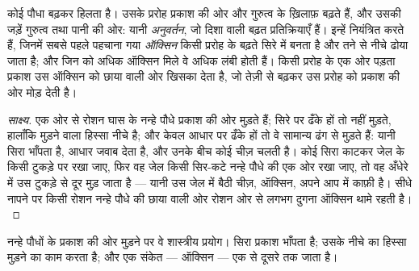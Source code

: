 \begin{proposition}[बढ़त ही हलचल]\label{prop:g12:plant-rooted-life:tropisms}
कोई पौधा बढ़कर हिलता है। उसके प्ररोह प्रकाश की ओर और गुरुत्व के ख़िलाफ़
बढ़ते हैं, और उसकी जड़ें गुरुत्व तथा पानी की ओर: यानी
\emph{अनुवर्तन}, जो दिशा वाली बढ़त प्रतिक्रियाएँ हैं। इन्हें
 नियंत्रित करते हैं, जिनमें सबसे पहले पहचाना गया \emph{ऑक्सिन} किसी
प्ररोह के बढ़ते सिरे में बनता है और तने से नीचे ढोया जाता है; और जिन
 को अधिक ऑक्सिन मिले वे अधिक लंबी होती हैं। किसी प्ररोह के एक ओर
पड़ता प्रकाश उस ऑक्सिन को छाया वाली ओर खिसका देता है, जो तेज़ी से बढ़कर उस
प्ररोह को प्रकाश की ओर मोड़ देती है।
\end{proposition}
\begin{proof}[साक्ष्य]
एक ओर से रोशन घास के नन्हे पौधे प्रकाश की ओर मुड़ते हैं; सिरे पर ढँके हों तो
नहीं मुड़ते, हालाँकि मुड़ने वाला हिस्सा नीचे है; और केवल आधार पर ढँके हों तो
वे सामान्य ढंग से मुड़ते हैं: यानी सिरा भाँपता है, आधार जवाब देता है, और
उनके बीच कोई चीज़ चलती है। कोई सिरा काटकर जेल के किसी टुकड़े पर रखा जाए,
फिर वह जेल किसी सिर-कटे नन्हे पौधे की एक ओर रखा जाए, तो वह अँधेरे में उस
टुकड़े से दूर मुड़ जाता है --- यानी उस जेल में बैठी चीज़, ऑक्सिन, अपने आप
में काफ़ी है। सीधे नापने पर किसी रोशन नन्हे पौधे की छाया वाली ओर रोशन ओर से
लगभग दुगना ऑक्सिन थामे रहती है।
\end{proof}

\begin{omfigure}

{\small नन्हे पौधों के प्रकाश की ओर मुड़ने पर वे शास्त्रीय प्रयोग। सिरा
प्रकाश भाँपता है; उसके नीचे का हिस्सा मुड़ने का काम करता है; और एक संकेत ---
ऑक्सिन --- एक से दूसरे तक जाता है।}
\end{omfigure}

